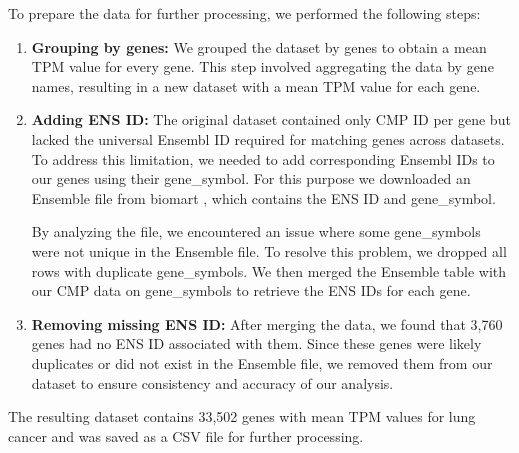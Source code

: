 To prepare the data for further processing, we performed the following steps:
\begin{enumerate}
    \item \textbf{Grouping by genes:} We grouped the dataset by genes to obtain a mean TPM value for every gene.
    This step involved aggregating the data by gene names, resulting in a new dataset with a mean TPM value for each gene.
    \item \textbf{Adding ENS ID:}
    The original dataset contained only CMP ID per gene but lacked the universal Ensembl ID required for matching genes across datasets.
    To address this limitation, we needed to add corresponding Ensembl IDs to our genes using their gene\_symbol.
    For this purpose we downloaded an Ensemble file from biomart \cite{bio_marts},
    which contains the ENS ID and gene\_symbol.

    By analyzing the file, we encountered an issue where some gene\_symbols were not unique in the Ensemble file.
    To resolve this problem, we dropped all rows with duplicate gene\_symbols. %
    We then merged the Ensemble table with our CMP data on gene\_symbols to retrieve the ENS IDs for each gene.

    \item \textbf{Removing missing ENS ID:} After merging the data, we found that 3,760 genes had no ENS ID associated with them.
    Since these genes were likely duplicates or did not exist in the Ensemble file,
    we removed them from our dataset to ensure consistency and accuracy of our analysis.
\end{enumerate}
The resulting dataset contains 33,502 genes with mean TPM values for lung cancer and was saved as a CSV file for further processing.


